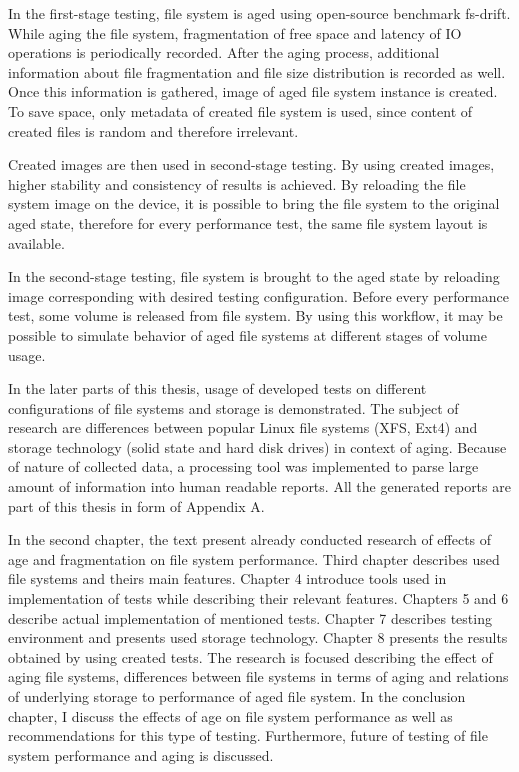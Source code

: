 \documentclass[
  color, %
  table, %
  lof,   %
  lot,   %
]{fithesis3}
\begin{document}
In the first-stage testing, file system is aged using open-source benchmark fs-drift. While aging the file system, fragmentation of free space and latency of IO operations is periodically recorded. After the aging process, additional information about file fragmentation and file size distribution is recorded as well. Once this information is gathered, image of aged file system instance is created. To save space, only metadata of created file system is used, since content of created files is random and therefore irrelevant.

Created images are then used in second-stage testing. By using created images, higher stability and consistency of results is achieved. By reloading the file system image on the device, it is possible to bring the file system to the original aged state, therefore for every performance test, the same file system layout is available.

In the second-stage testing, file system is brought to the aged state by reloading image corresponding with desired testing configuration. Before every performance test, some volume is released from file system. By using this workflow, it may be possible to simulate behavior of aged file systems at different stages of volume usage.


In the later parts of this thesis, usage of developed tests on different configurations of file systems and storage is demonstrated. The subject of research are differences between popular Linux file systems (XFS, Ext4) and storage technology (solid state and hard disk drives) in context of aging. Because of nature of collected data, a processing tool was implemented to parse large amount of information into human readable reports. All the generated reports are part of this thesis in form of Appendix A.

In the second chapter, the text present already conducted research of effects of age and fragmentation on file system performance. Third chapter describes used file systems and theirs main features. Chapter 4 introduce tools used in implementation of tests while describing their relevant features. Chapters 5 and 6 describe actual implementation of mentioned tests. Chapter 7 describes testing environment and presents used storage technology. Chapter 8 presents the results obtained by using created tests. The research is focused describing the effect of aging file systems, differences between file systems in terms of aging and relations of underlying storage to performance of aged file system. In the conclusion chapter, I discuss the effects of age on file system performance as well as recommendations for this type of testing. Furthermore, future of testing of file system performance and aging is discussed.
\end{document}
